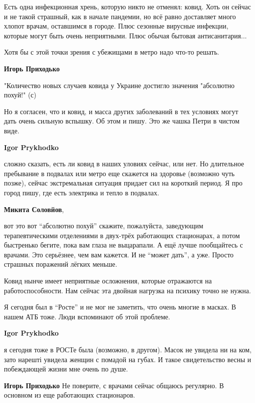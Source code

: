 \begin{itemize}

Есть одна инфекционная хрень, которую никто не отменял: ковид. Хоть он сейчас и
не такой страшный, как в начале пандемии, но всё равно доставляет много хлопот
врачам, оставшимся в городе. Плюс сезонные вирусные инфекции, которые могут
быть очень неприятными. Плюс обычая бытовая антисанитария...

Хотя бы с этой точки зрения с убежищами в метро надо что-то решать.

\begin{itemize} %
\textbf{Игорь Приходько} 

"Количество новых случаев ковида у Украине достигло значения "абсолютно похуй!" (с)

Но я согласен, что и ковид, и масса других заболеваний в тех условиях могут
дать очень сильную вспышку. Об этом и пишу. Это же чашка Петри в чистом виде.

\textbf{Igor Prykhodko} 

сложно сказать, есть ли ковид в наших уловиях сейчас, или нет. Но длительное
пребывание в подвалах или метро еще скажется на здоровье (возможно чуть позже),
сейчас экстремальная ситуация придает сил на короткий период. Я про город пишу,
где есть электрика и тепло в подвалах.

\textbf{Микита Соловйов}, 

вот это вот \enquote{абсолютно похуй} скажите, пожалуйста, заведующим терапевтическими
отделениями в двух-трёх работающих стационарах, а потом быстренько бегите, пока
вам глаза не выцарапали. А ещё лучше пообщайтесь с врачами. Это серьёзнее, чем
вам кажется. И не \enquote{может дать}, а уже. Просто страшных поражений лёгких меньше.

Ковид нынче имеет неприятные осложнения, которые отражаются на
работоспособности. Нам сейчас эта двойная нагрузка на психику точно не нужна.

Я сегодня был в \enquote{Росте} и не мог не заметить, что очень многие в
масках. В нашем АТБ тоже. Люди вспоминают об этой проблеме.

\textbf{Igor Prykhodko} 

я сегодня тоже в РОСТе была (возможно, в другом). Масок не увидела ни на ком,
зато нарешті увидела женщин с помадой на губах. И такое свидетельство весны и
побеждающей жизни мне очень по душе.

\textbf{Игорь Приходько} Не поверите, с врачами сейчас общаюсь регулярно. В основном из еще работающих стационаров.


\end{itemize}
\end{itemize}
